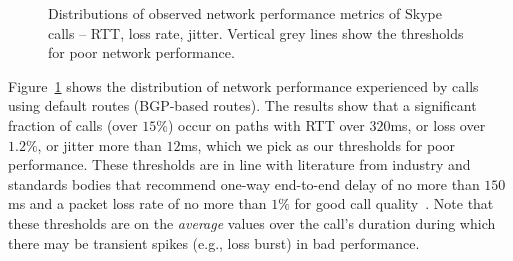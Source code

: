 \begin{figure}[t!]
\centering
{}
\caption{Distributions of observed network performance metrics of Skype calls -- 
RTT, loss rate, jitter. Vertical grey lines show the thresholds 
for poor network performance.}
\label{fig:perf-cdf}
\end{figure}

Figure~\ref{fig:perf-cdf} shows the distribution of network 
performance experienced by calls  using default routes (BGP-based routes). 
The results show that a significant fraction of calls (over $15\%$) occur on paths with 
RTT over $320$ms, or loss over $1.2\%$, or jitter more than 
$12$ms, which we pick as our thresholds for 
poor performance. %
These thresholds are in line with literature from industry 
and standards bodies that recommend one-way end-to-end 
delay of no more than $150$ ms and a packet loss rate of 
no more than $1\%$ for good call quality~\cite{cisco-voip, itu}. 
Note that these thresholds are on the {\em average} 
values over the call's duration during which there may 
be transient spikes (e.g., loss burst) in bad performance.





